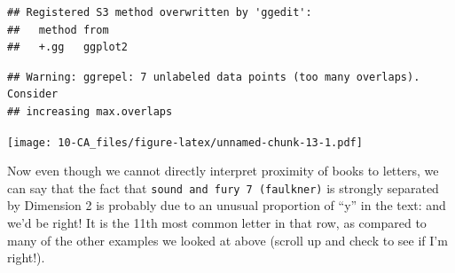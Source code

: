 \documentclass[
]{book}
\newenvironment{Shaded}{\begin{snugshade}}{\end{snugshade}}
\newcommand{\AttributeTok}[1]{\textcolor[rgb]{0.13,0.29,0.53}{#1}}
\newcommand{\CommentTok}[1]{\textcolor[rgb]{0.56,0.35,0.01}{\textit{#1}}}
\newcommand{\DecValTok}[1]{\textcolor[rgb]{0.00,0.00,0.81}{#1}}
\newcommand{\FunctionTok}[1]{\textcolor[rgb]{0.13,0.29,0.53}{\textbf{#1}}}
\newcommand{\NormalTok}[1]{#1}
\newcommand{\OtherTok}[1]{\textcolor[rgb]{0.56,0.35,0.01}{#1}}
\newcommand{\SpecialCharTok}[1]{\textcolor[rgb]{0.81,0.36,0.00}{\textbf{#1}}}
\newcommand{\StringTok}[1]{\textcolor[rgb]{0.31,0.60,0.02}{#1}}
\begin{document}
\begin{Shaded}
\end{Shaded}

\begin{verbatim}
## Registered S3 method overwritten by 'ggedit':
##   method from   
##   +.gg   ggplot2
\end{verbatim}

\begin{verbatim}
## Warning: ggrepel: 7 unlabeled data points (too many overlaps). Consider
## increasing max.overlaps
\end{verbatim}

\texttt{[image: 10-CA\_files/figure-latex/unnamed-chunk-13-1.pdf]}

Now even though we cannot directly interpret proximity of books to letters, we can say that the fact that \texttt{sound\ and\ fury\ 7\ (faulkner)} is strongly separated by Dimension 2 is probably due to an unusual proportion of ``y'' in the text: and we'd be right! It is the 11th most common letter in that row, as compared to many of the other examples we looked at above (scroll up and check to see if I'm right!).
\end{document}
